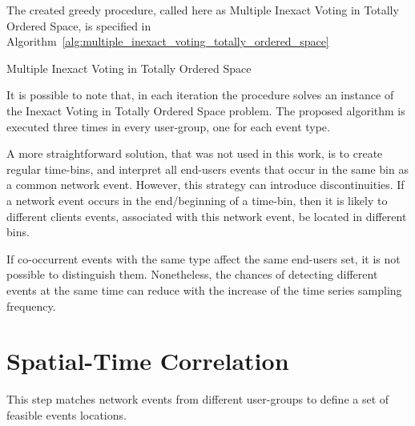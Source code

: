 The created greedy procedure, called here as Multiple Inexact Voting in Totally
Ordered Space, is specified in
Algorithm~\ref{alg:multiple_inexact_voting_totally_ordered_space}

\begin{algorithm}[H]
\caption{Multiple Inexact Voting in Totally Ordered Space}
\label{alg:multiple_inexact_voting_totally_ordered_space}
    \begin{algorithmic}[1]
        \EndWhile{}
    \end{algorithmic}
\end{algorithm}

It is possible to note that, in each iteration the procedure solves an instance
of the Inexact Voting in Totally Ordered Space problem.
The proposed algorithm is executed three times in every user-group,
one for each event type.

A more straightforward solution, that was not used in this work, is to create
regular time-bins, and interpret all end-users events that occur in the same
bin as a common network event.
However, this strategy can introduce
discontinuities. If a network event occurs in the end/beginning of a time-bin,
then it is likely to different clients events, associated with this
network event, be located in different bins.

If co-occurrent events with the same type affect the same end-users set,
it is not possible to distinguish them. Nonetheless, the chances of
detecting different events at the same time can reduce with the increase
of the time series sampling frequency.

\section{Spatial-Time Correlation}
\label{sec:spatial_time_correlation}

This step matches network events from different user-groups to define
a set of feasible events locations.


